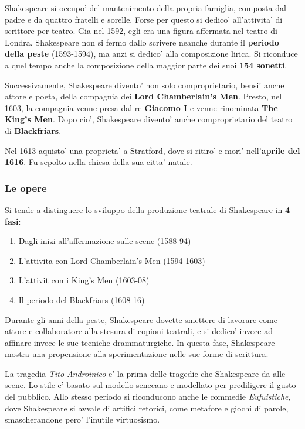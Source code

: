 \documentclass{article}
\begin{document}
{{    Shakespeare si occupo' del mantenimento della propria famiglia, composta dal padre e da quattro fratelli e sorelle. Forse per questo si dedico' all'attivita' di scrittore per teatro. Gia nel 1592, egli era una figura affermata nel teatro di Londra. Shakespeare non si fermo dallo scrivere neanche durante il \textbf{periodo della peste} \small{(1593-1594)}, ma anzi si dedico' alla composizione lirica. Si riconduce a quel tempo anche la composizione della maggior parte dei suoi \textbf{154 sonetti}.

    Successivamente, Shakespeare divento' non solo comproprietario, bensi' anche attore e poeta, della compagnia dei \textbf{Lord Chamberlain's Men}. Presto, nel 1603, la compagnia venne presa dal re \textbf{Giacomo I} e venne rinominata \textbf{The King's Men}. Dopo cio', Shakespeare divento' anche comproprietario del teatro di \textbf{Blackfriars}.

    Nel 1613 aquisto' una proprieta' a Stratford, dove si ritiro' e mori' nell'\textbf{aprile del 1616}. Fu sepolto nella chiesa della sua citta' natale.

    \subsubsection{Le opere}
    Si tende a distinguere lo sviluppo della produzione teatrale di Shakespeare in \textbf{4 fasi}:
    \begin{enumerate}
      \item Dagli inizi all'affermazione sulle scene (1588-94)
      \item L'attivita con Lord Chamberlain's Men (1594-1603)
      \item L'attivit con i King's Men (1603-08)
      \item Il periodo del Blackfriars (1608-16)
    \end{enumerate}

    Durante gli anni della peste, Shakespeare dovette smettere di lavorare come attore e collaboratore alla stesura di copioni teatrali, e si dedico' invece ad affinare invece le sue tecniche drammaturgiche. In questa fase, Shakespeare mostra una propensione alla sperimentazione nelle sue forme di scrittura.

    La tragedia \textit{Tito Androinico} e' la prima delle tragedie che Shakespeare da alle scene. Lo stile e' basato sul modello senecano e modellato per prediligere il gusto del pubblico. Allo stesso periodo si riconducono anche le commedie \textit{Eufuistiche}, dove Shakespeare si avvale di artifici retorici, come metafore e giochi di parole, smascherandone pero' l'inutile virtuosismo.

}}
\end{document}
